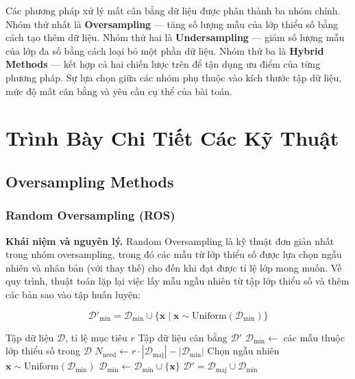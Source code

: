 Các phương pháp xử lý mất cân bằng dữ liệu được phân thành ba nhóm chính. Nhóm thứ nhất là \textbf{Oversampling} --- tăng số lượng mẫu của lớp thiểu số bằng cách tạo thêm dữ liệu. Nhóm thứ hai là \textbf{Undersampling} --- giảm số lượng mẫu của lớp đa số bằng cách loại bỏ một phần dữ liệu. Nhóm thứ ba là \textbf{Hybrid Methods} --- kết hợp cả hai chiến lược trên để tận dụng ưu điểm của từng phương pháp. Sự lựa chọn giữa các nhóm phụ thuộc vào kích thước tập dữ liệu, mức độ mất cân bằng và yêu cầu cụ thể của bài toán.

\section{Trình Bày Chi Tiết Các Kỹ Thuật}

\subsection{Oversampling Methods}

\subsubsection{Random Oversampling (ROS)}

\textbf{Khái niệm và nguyên lý.}
Random Oversampling là kỹ thuật đơn giản nhất trong nhóm oversampling, trong đó các mẫu từ lớp thiểu số được lựa chọn ngẫu nhiên và nhân bản (với thay thế) cho đến khi đạt được tỉ lệ lớp mong muốn. Về quy trình, thuật toán lặp lại việc lấy mẫu ngẫu nhiên từ tập lớp thiểu số và thêm các bản sao vào tập huấn luyện:

\begin{equation}
  \mathcal{D}'_{\min}
  = \mathcal{D}_{\min}
    \cup \bigl\{\mathbf{x} \mid \mathbf{x}
    \sim \mathrm{Uniform}(\mathcal{D}_{\min})\bigr\}
  \label{eq:ros}
\end{equation}

\begin{algorithm}[H]
\caption{Random Oversampling (ROS)}
\begin{algorithmic}[1]
  \Require Tập dữ liệu $\mathcal{D}$, tỉ lệ mục tiêu $r$
  \Ensure Tập dữ liệu cân bằng $\mathcal{D}'$
  \State $\mathcal{D}_{\min} \leftarrow$ các mẫu thuộc lớp thiểu số trong $\mathcal{D}$
  \State $N_{\text{need}} \leftarrow r \cdot |\mathcal{D}_{\text{maj}}| - |\mathcal{D}_{\min}|$
    \State Chọn ngẫu nhiên $\mathbf{x} \sim \mathrm{Uniform}(\mathcal{D}_{\min})$
    \State $\mathcal{D}_{\min} \leftarrow \mathcal{D}_{\min} \cup \{\mathbf{x}\}$
  \EndFor
  \State \Return $\mathcal{D}' = \mathcal{D}_{\text{maj}} \cup \mathcal{D}_{\min}$
\end{algorithmic}
\end{algorithm}

